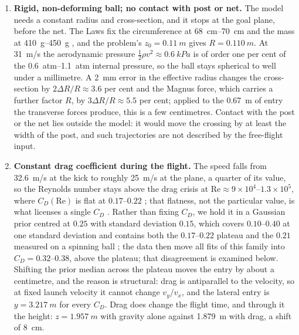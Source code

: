 \begin{enumerate}[label=\textbf{A\arabic*},leftmargin=*,itemsep=6pt]

\item \textbf{Rigid, non-deforming ball; no contact with post or net.}
The model needs a constant radius and cross-section, and it stops at the goal
plane, before the net. The Laws fix the circumference at \SIrange{68}{70}{cm}
and the mass at \SIrange{410}{450}{g} \citep{ifab2025}, and the problem's
$z_0=\SI{0.11}{m}$ gives $R=\SI{0.110}{m}$. At \SI{31}{m/s} the aerodynamic
pressure $\tfrac12\rho v^2\approx\SI{0.6}{kPa}$ is of order one per cent of
the \SIrange{0.6}{1.1}{atm} internal pressure, so the ball stays spherical to
well under a millimetre. A \SI{2}{mm} error in the effective radius changes
the cross-section by $2\Delta R/R\approx3.6$ per cent and the Magnus force,
which carries a further factor $R$, by $3\Delta R/R\approx5.5$ per cent;
applied to the \SI{0.67}{m} of entry the transverse forces produce, this is a
few centimetres. Contact with the post or the net lies outside the model: it
would move the crossing by at least the width of the post, and such
trajectories are not described by the free-flight input.

\item \textbf{Constant drag coefficient during the flight.}
The speed falls from \SI{32.6}{m/s} at the kick to roughly \SI{25}{m/s} at
the plane, a quarter of its value, so the Reynolds number stays above the drag
crisis at $\mathrm{Re}\approx9\times10^4$--$1.3\times10^5$, where
$C_D(\mathrm{Re})$ is flat at $0.17$--$0.22$ \citep{carre2005,goff2012}; that
flatness, not the particular value, is what licenses a single $C_D$
\citep{mehta1985}. Rather than fixing $C_D$, we hold
it in a Gaussian prior centred at $0.25$ with standard deviation $0.15$, which
covers $0.10$--$0.40$ at one standard deviation and contains both the
$0.17$--$0.22$ plateau and the $0.21$ measured on a spinning ball
\citep{asai2020}; the data then move all fits of this family into
$C_D=0.32$--$0.38$, above the plateau; that disagreement is examined below. Shifting the prior median across the plateau moves the
entry by about a centimetre, and the reason is structural: drag is
antiparallel to the velocity, so at fixed launch velocity it cannot change
$v_y/v_x$, and the lateral entry is $y=\SI{3.217}{m}$ for every $C_D$. Drag
does change the flight time, and through it the height: $z=\SI{1.957}{m}$ with
gravity alone against \SI{1.879}{m} with drag, a shift of \SI{8}{cm}.


\end{enumerate}

